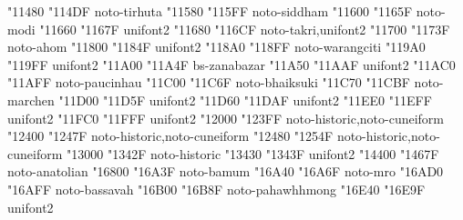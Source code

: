 \documentclass{article}
\begin{document}
                                        { "11480} { "114DF} {noto-tirhuta}
                                        { "11580} { "115FF} {noto-siddham}
                                           { "11600} { "1165F} {noto-modi}
                           { "11660} { "1167F} {unifont2}
                                          { "11680} { "116CF} {noto-takri,unifont2}
                                           { "11700} { "1173F} {noto-ahom}
                                          { "11800} { "1184F} {unifont2}
                                    { "118A0} { "118FF} {noto-warangciti}
                                    { "119A0} { "119FF} {unifont2}
                               { "11A00} { "11A4F} {bs-zanabazar}
                                        { "11A50} { "11AAF} {unifont2}
                                    { "11AC0} { "11AFF} {noto-paucinhau}
                                      { "11C00} { "11C6F} {noto-bhaiksuki}
                                        { "11C70} { "11CBF} {noto-marchen}
                                  { "11D00} { "11D5F} {unifont2}
                                  { "11D60} { "11DAF} {unifont2}
                                        { "11EE0} { "11EFF} {unifont2}
                               { "11FC0} { "11FFF} {unifont2}
                                      { "12000} { "123FF} {noto-historic,noto-cuneiform}
              { "12400} { "1247F} {noto-historic,noto-cuneiform}
                       { "12480} { "1254F} {noto-historic,noto-cuneiform}
                           { "13000} { "1342F} {noto-historic}
            { "13430} { "1343F} {unifont2}
                          { "14400} { "1467F} {noto-anatolian}
                               { "16800} { "16A3F} {noto-bamum}
                                            { "16A40} { "16A6F} {noto-mro}
                                      { "16AD0} { "16AFF} {noto-bassavah}
                                   { "16B00} { "16B8F} {noto-pahawhhmong}
                                    { "16E40} { "16E9F} {unifont2}
\end{document}
